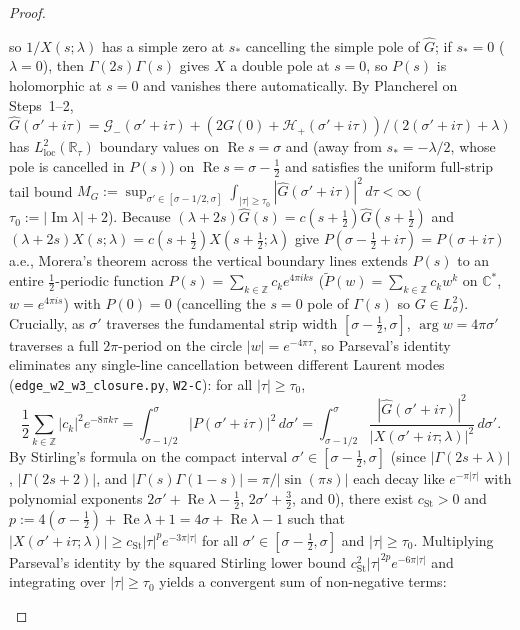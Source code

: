 \documentclass[11pt,a4paper]{article}
\begin{document}
\begin{proof}
\begin{enumerate}
  so $1/X(s;\lambda)$ has a simple zero at $s_*$ cancelling the simple pole of $\widehat{G}$; if $s_*=0$ ($\lambda=0$),
  then $\Gamma(2s)\Gamma(s)$ gives $X$ a double pole at $s=0$, so $P(s)$ is holomorphic at $s=0$ and vanishes there automatically.
  By Plancherel on Steps~1--2, $\widehat{G}(\sigma'+i\tau)=\mathcal{G}_-(\sigma'+i\tau)+(2G(0)+\mathcal{H}_+(\sigma'+i\tau))/(2(\sigma'+i\tau)+\lambda)$
  has $L^2_{\mathrm{loc}}(\mathbb{R}_\tau)$ boundary values on $\operatorname{Re}s=\sigma$ and (away from $s_*=-\lambda/2$, whose pole is cancelled in $P(s)$) on $\operatorname{Re}s=\sigma-\tfrac12$
  and satisfies the uniform full-strip tail bound
  $M_G:=\sup_{\sigma'\in[\sigma-1/2,\sigma]}\int_{|\tau|\ge\tau_0}|\widehat{G}(\sigma'+i\tau)|^2\,d\tau<\infty$
  ($\tau_0:=|\operatorname{Im}\lambda|+2$).
  Because $(\lambda+2s)\widehat{G}(s)=c(s+\tfrac12)\widehat{G}(s+\tfrac12)$ and $(\lambda+2s)X(s;\lambda)=c(s+\tfrac12)X(s+\tfrac12;\lambda)$
  give $P(\sigma-\tfrac12+i\tau)=P(\sigma+i\tau)$ a.e., Morera's theorem across the vertical boundary lines extends $P(s)$
  to an entire $\tfrac12$-periodic function $P(s)=\sum_{k\in\mathbb{Z}}c_k e^{4\pi i k s}$ ($\widetilde{P}(w)=\sum_{k\in\mathbb{Z}}c_k w^k$
  on $\mathbb{C}^*$, $w=e^{4\pi i s}$) with $P(0)=0$ (cancelling the $s=0$ pole of $\Gamma(s)$ so $G\in L^2_\sigma$).
  Crucially, as $\sigma'$ traverses the fundamental strip width $[\sigma-\tfrac12,\sigma]$, $\arg w=4\pi\sigma'$ traverses a full
  $2\pi$-period on the circle $|w|=e^{-4\pi\tau}$, so Parseval's identity eliminates any single-line cancellation between different
  Laurent modes (\texttt{edge\_w2\_w3\_closure.py}, \texttt{W2-C}): for all $|\tau|\ge\tau_0$,
  \[
  \frac{1}{2}\sum_{k\in\mathbb{Z}}|c_k|^2 e^{-8\pi k\tau}
  = \int_{\sigma-1/2}^\sigma |P(\sigma'+i\tau)|^2\,d\sigma'
  = \int_{\sigma-1/2}^\sigma \frac{|\widehat{G}(\sigma'+i\tau)|^2}{|X(\sigma'+i\tau;\lambda)|^2}\,d\sigma'.
  \]
  By Stirling's formula on the compact interval $\sigma'\in[\sigma-\tfrac12,\sigma]$ (since $|\Gamma(2s+\lambda)|$,
  $|\Gamma(2s+2)|$, and $|\Gamma(s)\Gamma(1-s)|=\pi/|\sin(\pi s)|$ each decay like $e^{-\pi|\tau|}$ with polynomial exponents
  $2\sigma'+\operatorname{Re}\lambda-\tfrac12$, $2\sigma'+\tfrac32$, and $0$), there exist $c_{\mathrm{St}}>0$ and
  $p:=4(\sigma-\tfrac12)+\operatorname{Re}\lambda+1=4\sigma+\operatorname{Re}\lambda-1$ such that
  $|X(\sigma'+i\tau;\lambda)|\ge c_{\mathrm{St}}|\tau|^p e^{-3\pi|\tau|}$ for all
  $\sigma'\in[\sigma-\tfrac12,\sigma]$ and $|\tau|\ge\tau_0$.  Multiplying Parseval's identity by the squared Stirling lower
  bound $c_{\mathrm{St}}^2|\tau|^{2p}e^{-6\pi|\tau|}$ and integrating over $|\tau|\ge\tau_0$ yields a convergent sum of non-negative terms:

\end{enumerate}
\end{proof}
\end{document}
